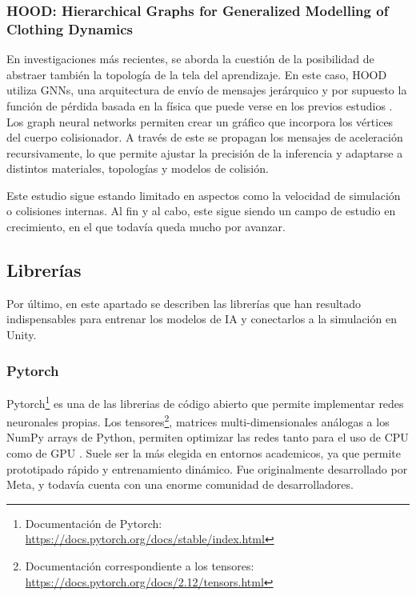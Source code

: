 \subsubsection{HOOD: Hierarchical Graphs for Generalized Modelling of Clothing Dynamics}
En investigaciones más recientes, se aborda la cuestión de la posibilidad de abstraer también la topología de la tela del aprendizaje. En este caso, HOOD utiliza GNNs, una arquitectura de envío de mensajes jerárquico y por supuesto la función de pérdida basada en la física que puede verse en los previos estudios \cite{grigorev_hood_2023}.  Los graph neural networks permiten crear un gráfico que incorpora los vértices del cuerpo colisionador. A través de este se propagan los mensajes de aceleración recursivamente, lo que permite ajustar la precisión de la inferencia y adaptarse a distintos materiales, topologías y modelos de colisión. \newline 

Este estudio sigue estando limitado en aspectos como la velocidad de simulación o colisiones internas. Al fin y al cabo, este sigue siendo un campo de estudio en crecimiento, en el que todavía queda mucho por avanzar.

\subsection{Librerías }
Por último, en este apartado se describen las librerías que han resultado indispensables para entrenar los modelos de IA y conectarlos a la simulación en Unity.

\subsubsection{Pytorch}
Pytorch\footnote{Documentación de Pytorch: \url{https://docs.pytorch.org/docs/stable/index.html}} es una de las librerias de código abierto que permite implementar redes neuronales propias. Los tensores\footnote{Documentación correspondiente a los tensores: \url{https://docs.pytorch.org/docs/2.12/tensors.html}}, matrices multi-dimensionales análogas a los NumPy arrays de Python, permiten optimizar las redes tanto para el uso de CPU como de GPU . Suele ser la más elegida en entornos academicos, ya que permite prototipado rápido y entrenamiento dinámico. Fue originalmente desarrollado por Meta, y todavía cuenta con una enorme comunidad de desarrolladores.

